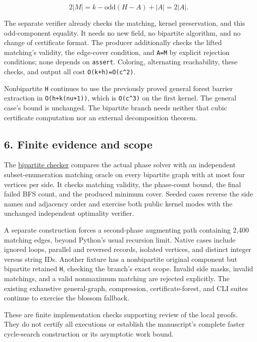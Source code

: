 \[
2|M|=k-\mathrm{odd}(H-A)+|A|=2|A|.
\]

The separate verifier already checks the matching, kernel preservation, and this odd-component equality. It needs no new field, no bipartite algorithm, and no change of certificate format. The producer additionally checks the lifted matching's validity, the edge-cover condition, and \texttt{\textbar{}A\textbar{}=\textbar{}M\textbar{}} by explicit rejection conditions; none depends on \texttt{assert}. Coloring, alternating reachability, these checks, and output all cost \texttt{O(k+h)=O(c\^{}2)}.

Nonbipartite \texttt{H} continues to use the previously proved general forest barrier extraction in \texttt{O(h+k(nu+1))}, which is \texttt{O(c\^{}3)} on the first kernel. The general case's bound is unchanged. The bipartite branch needs neither that cubic certificate computation nor an external decomposition theorem.

\hypertarget{af-4c656876fd-finite-evidence-and-scope}{%
\subsection{6. Finite evidence and scope}\label{af-4c656876fd-finite-evidence-and-scope}}

The \href{https://github.com/icekylinx/algorithm-frontier/blob/main/problems/general-matching/verify/check_bipartite.py}{bipartite checker} compares the actual phase solver with an independent subset-enumeration matching oracle on every bipartite graph with at most four vertices per side. It checks matching validity, the phase-count bound, the final failed BFS count, and the produced minimum cover. Seeded cases reverse the side names and adjacency order and exercise both public kernel modes with the unchanged independent optimality verifier.

A separate construction forces a second-phase augmenting path containing 2,400 matching edges, beyond Python's usual recursion limit. Native cases include ignored loops, parallel and reversed records, isolated vertices, and distinct integer versus string IDs. Another fixture has a nonbipartite original component but bipartite retained \texttt{H}, checking the branch's exact scope. Invalid side masks, invalid matchings, and a valid nonmaximum matching are rejected explicitly. The existing exhaustive general-graph, compression, certificate-forest, and CLI suites continue to exercise the blossom fallback.

These are finite implementation checks supporting review of the local proofs. They do not certify all executions or establish the manuscript's complete faster cycle-search construction or its asymptotic work bound.
